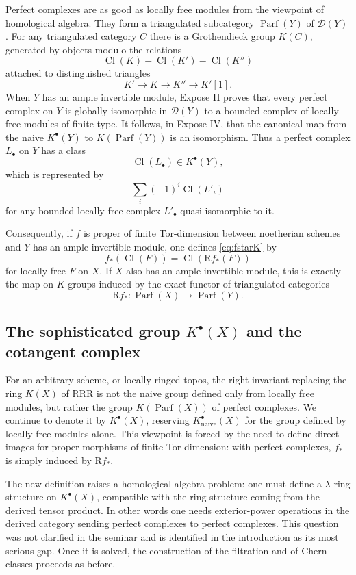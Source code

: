 \documentclass[11pt]{article}
\theoremstyle{plain}
\theoremstyle{definition}
\theoremstyle{remark}
\newcommand{\D}{\mathcal D}\newcommand{\E}{\mathcal E}\newcommand{\F}{\mathcal F}
\newcommand{\R}{\mathrm R}
\providecommand{\Cl}{\operatorname{Cl}}
\providecommand{\Parf}{\operatorname{Parf}}
\begin{document}
Perfect complexes are as good as locally free modules from the viewpoint of homological algebra. They form a triangulated subcategory $\Parf(Y)$ of $\D(Y)$. For any triangulated category $C$ there is a Grothendieck group $K(C)$, generated by objects modulo the relations
\[
   \Cl(K)-\Cl(K')-\Cl(K'')
\]
attached to distinguished triangles
\[
   K'\to K\to K''\to K'[1].
\]
When $Y$ has an ample invertible module, Expose II proves that every perfect complex on $Y$ is globally isomorphic in $\D(Y)$ to a bounded complex of locally free modules of finite type. It follows, in Expose IV, that the canonical map from the naive $K^{\bullet}(Y)$ to $K(\Parf(Y))$ is an isomorphism. Thus a perfect complex $L_{\bullet}$ on $Y$ has a class
\[
   \Cl(L_{\bullet})\in K^{\bullet}(Y),
\]
which is represented by
\[
   \sum_i(-1)^i\Cl(L'_i)
\]
for any bounded locally free complex $L'_{\bullet}$ quasi-isomorphic to it.

Consequently, if $f$ is proper of finite Tor-dimension between noetherian schemes and $Y$ has an ample invertible module, one defines \eqref{eq:fstarK} by
\begin{equation}\label{eq:derivedpush}
   f_*(\Cl(F))=\Cl(\R f_*(F))
\end{equation}
for locally free $F$ on $X$. If $X$ also has an ample invertible module, this is exactly the map on $K$-groups induced by the exact functor of triangulated categories
\[
   \R f_*:\Parf(X)\to\Parf(Y).
\]

\subsection{The sophisticated group $K^{\bullet}(X)$ and the cotangent complex}

For an arbitrary scheme, or locally ringed topos, the right invariant replacing the ring $K(X)$ of RRR is not the naive group defined only from locally free modules, but rather the group $K(\Parf(X))$ of perfect complexes. We continue to denote it by $K^{\bullet}(X)$, reserving $K^{\bullet}_{\mathrm{naive}}(X)$ for the group defined by locally free modules alone. This viewpoint is forced by the need to define direct images for proper morphisms of finite Tor-dimension: with perfect complexes, $f_*$ is simply induced by $\R f_*$.

The new definition raises a homological-algebra problem: one must define a $\lambda$-ring structure on $K^{\bullet}(X)$, compatible with the ring structure coming from the derived tensor product. In other words one needs exterior-power operations in the derived category sending perfect complexes to perfect complexes. This question was not clarified in the seminar and is identified in the introduction as its most serious gap. Once it is solved, the construction of the filtration and of Chern classes proceeds as before.
\end{document}
